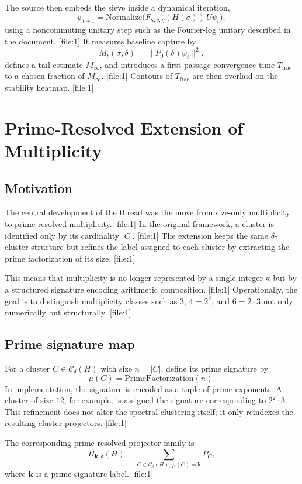 \documentclass[11pt]{article}
\begin{document}
The source then embeds the sieve inside a dynamical iteration,
\[
\psi_{t+1} = \mathrm{Normalize}\big(F_{\kappa,\delta,\eta}(H(\sigma))\,U\psi_t\big),
\]
using a noncommuting unitary step such as the Fourier-log unitary described in the document. [file:1] It measures baseline capture by
\[
M_t(\sigma,\delta) = \|P_0(\delta)\psi_t\|^2,
\]
defines a tail estimate $M_{\infty}$, and introduces a first-passage convergence time $T_{\mathrm{frac}}$ to a chosen fraction of $M_{\infty}$. [file:1] Contours of $T_{\mathrm{frac}}$ are then overlaid on the stability heatmap. [file:1]

\section{Prime-Resolved Extension of Multiplicity}

\subsection{Motivation}

The central development of the thread was the move from size-only multiplicity to prime-resolved multiplicity. [file:1] In the original framework, a cluster is identified only by its cardinality $|C|$. [file:1] The extension keeps the same $\delta$-cluster structure but refines the label assigned to each cluster by extracting the prime factorization of its size. [file:1]

This means that multiplicity is no longer represented by a single integer $\kappa$ but by a structured signature encoding arithmetic composition. [file:1] Operationally, the goal is to distinguish multiplicity classes such as $3$, $4=2^2$, and $6=2\cdot 3$ not only numerically but structurally. [file:1]

\subsection{Prime signature map}

For a cluster $C\in \mathcal C_{\delta}(H)$ with size $n=|C|$, define its prime signature by
\[
\mu(C) = \mathrm{PrimeFactorization}(n).
\]
In implementation, the signature is encoded as a tuple of prime exponents. A cluster of size $12$, for example, is assigned the signature corresponding to $2^2\cdot 3$. This refinement does not alter the spectral clustering itself; it only reindexes the resulting cluster projectors. [file:1]

The corresponding prime-resolved projector family is
\[
\Pi_{\mathbf{k},\delta}(H) = \sum_{C\in \mathcal C_{\delta}(H),\, \mu(C)=\mathbf{k}} P_C,
\]
where $\mathbf{k}$ is a prime-signature label. [file:1]
\end{document}
